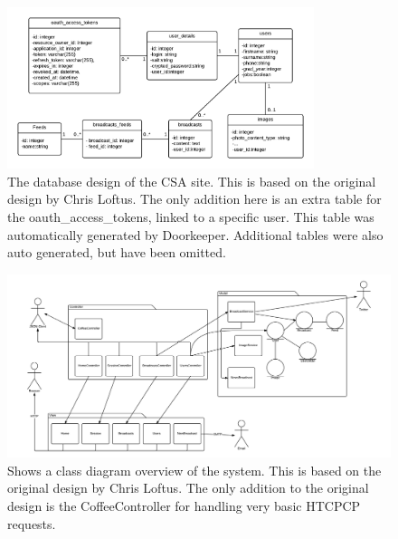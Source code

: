 \documentclass[paper=a4, fontsize=11pt]{scrartcl}	%
\numberwithin{equation}{section}															%
\numberwithin{figure}{section}																%
\numberwithin{table}{section}
\begin{document}
\begin{figure}[H]
\centering
\includegraphics[width=0.8\textwidth]{img/database_design.png}
\caption{The database design of the CSA site. This is based on the original design by Chris Loftus. The only addition here is an extra table for the oauth\_access\_tokens, linked to a specific user. This table was automatically generated by Doorkeeper. Additional tables were also auto generated, but have been omitted.}
\label{fig:database-design}
\end{figure}

\begin{figure}[H]
\centering
\includegraphics[width=1.1\textwidth]{img/entity_relationship.png}
\caption{Shows a class diagram overview of the system. This is based on the original design by Chris Loftus. The only addition to the original design is the CoffeeController for handling very basic HTCPCP requests.}
\label{fig:entity-realtionship}
\end{figure}
\end{document}

